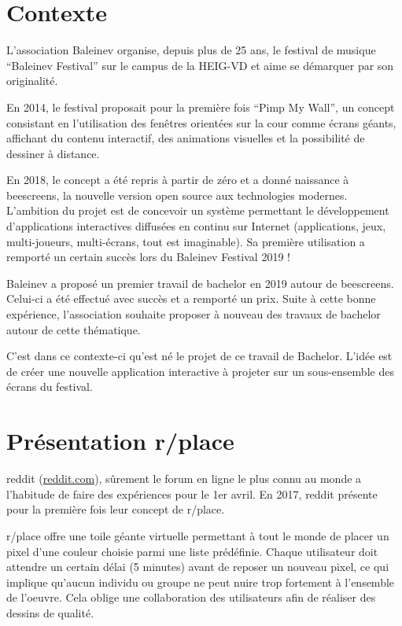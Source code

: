\section{Contexte}
L'association Baleinev organise, depuis plus de 25 ans, le festival de musique “Baleinev Festival” sur le campus de la HEIG-VD et aime se démarquer par son originalité.

En 2014, le festival proposait pour la première fois “Pimp My Wall”, un concept consistant en l'utilisation des fenêtres orientées sur la cour comme écrans géants, affichant du contenu interactif, des animations visuelles et la possibilité de dessiner à distance.

En 2018, le concept a été repris à partir de zéro et a donné naissance à \gls{beescreens}, la nouvelle version open source aux technologies modernes. L'ambition du projet est de concevoir un système permettant le développement d'applications interactives diffusées en continu sur Internet (applications, jeux, multi-joueurs, multi-écrans, tout est imaginable). Sa première utilisation a remporté un certain succès lors du Baleinev Festival 2019 !

Baleinev a proposé un premier travail de bachelor en 2019 autour de \gls{beescreens}. Celui-ci a été effectué avec succès et a remporté un prix. Suite à cette bonne expérience, l'association souhaite proposer à nouveau des travaux de bachelor autour de cette thématique.

C'est dans ce contexte-ci qu'est né le projet de ce travail de Bachelor. L'idée est de créer une nouvelle application interactive à projeter sur un sous-ensemble des écrans du festival.

\section{Présentation r/place}
\gls{reddit} (\href{https://www.reddit.com}{reddit.com}), sûrement le forum en ligne le plus connu au monde a l'habitude de faire des expériences pour le 1er avril. En 2017, \gls{reddit} présente pour la première fois leur concept de r/place.

r/place \cite{rplace} offre une toile géante virtuelle permettant à tout le monde de placer un pixel d'une couleur choisie parmi une liste prédéfinie. Chaque utilisateur doit attendre un certain délai (5 minutes) avant de reposer un nouveau pixel, ce qui implique qu'aucun individu ou groupe ne peut nuire trop fortement à l'ensemble de l'oeuvre. Cela oblige une collaboration des utilisateurs afin de réaliser des dessins de qualité.

